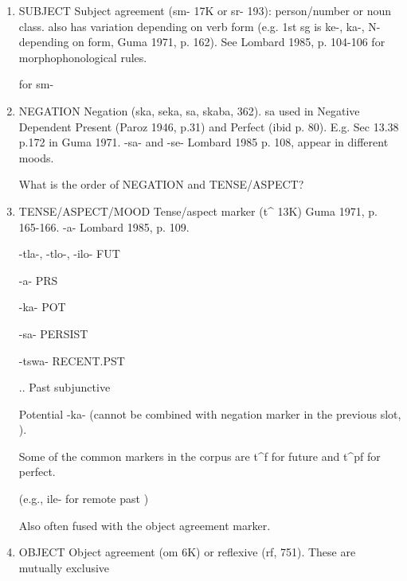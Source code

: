 \begin{enumerate}


    \item SUBJECT Subject agreement (sm- 17K or sr- 193): person/number or noun class. also has variation depending on verb form (e.g. 1st sg is ke-, ka-, N- depending on form, Guma 1971, p. 162). See Lombard 1985, p. 104-106 for morphophonological rules.
    
    \cite[]{doke1967textbook} for sm-
    
    \item NEGATION Negation (ska, seka, sa, skaba, 362). sa used in Negative Dependent Present (Paroz 1946, p.31) and Perfect (ibid p. 80). E.g. Sec 13.38 p.172 in Guma 1971. -sa- and -se- Lombard 1985 p. 108, appear in different moods.
    
    What is the order of NEGATION and TENSE/ASPECT?
    
    \item TENSE/ASPECT/MOOD Tense/aspect marker (t\^{} 13K) Guma 1971, p. 165-166. -a- Lombard 1985, p. 109.
    
    -tla-, -tlo-, -ilo- FUT \cite[]{doke1967textbook}
    
    -a- PRS \cite[]{doke1967textbook}
    
    -ka- POT \cite[]{doke1967textbook}
    
    -sa- PERSIST \cite[]{doke1967textbook}
    
    -tswa- RECENT.PST \cite[]{doke1967textbook} 
    
    ..
    Past subjunctive
    
    
    Potential -ka- (cannot be combined with negation marker in the previous slot, \cite[]{doke1967textbook}).
    
    
    Some of the common markers in the corpus are t\^{}f for future and t\^{}pf for perfect.
    
    (e.g., ile- for remote past \cite[]{doke1967textbook})
    
    Also often fused with the object agreement marker.
    
    
    \item OBJECT Object agreement (om 6K) or reflexive (rf, 751). These are mutually exclusive \cite[p. 165]{guma1971handbook}
\end{enumerate}



